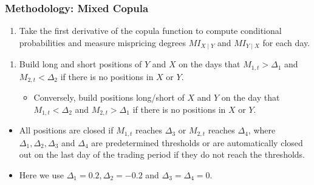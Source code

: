 \documentclass[pdf,9pt,xcolor=dvipsnames,hide notes]{beamer}
\begin{document}
\begin{frame}
\frametitle{Methodology: Mixed Copula}

	\begin{enumerate}[(3)]
	\justifying
	
	
	\pause
		
		\item Take the first derivative of the copula function to compute conditional
		probabilities and measure mispricing degrees $MI_{X\mid Y}$ and $MI_{Y\mid X}$ for each day.
		
		
		\vspace{0.3cm}
		
	\end{enumerate}

	\pause
	\begin{enumerate}[(4)]
	\justifying
		
		\item Build long and short positions of $Y$ and $X$ on the days that $M_{1,t}>\Delta_{1}$ and $M_{2,t}<\Delta_{2}$ if there is no positions in $X$ or $Y$. 
		
		\vspace{0.1cm}
		\begin{itemize}
			\item Conversely, build positions long/short of $X$ and $Y$ on the day that $M_{1,t}<\Delta_{2}$ and $M_{2,t}>\Delta_{1}$ if there is no positions in $X$ or $Y$.
		\end{itemize}
		
	\end{enumerate}

	\pause
		\begin{itemize}
	\item  All positions are closed if $M_{1,t}$ reaches $\Delta_{3}$ or $M_{2,t}$ reaches $\Delta_{4}$, where $\Delta_{1},\Delta_{2},\Delta_{3}$ and $\Delta_{4}$ are predetermined thresholds or are automatically closed out on the last day of the trading period if they do not reach the thresholds. 
	
	\vspace{0.3cm}
	\pause
	
	\item Here we use $\Delta_{1}=0.2, \Delta_{2}=-0.2$ and $\Delta_{3}=\Delta_{4}=0$.
	
	\end{itemize}
	
\end{frame}
\end{document}
